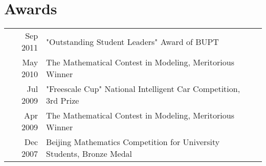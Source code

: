 \documentclass[]{Hsb_resume}
\begin{document}
\begin{minipage}[t]{0.66\textwidth}

\vspace{-4pt}
\section{Awards} 
\begin{tabular}{rll}
Sep 2011   &  "Outstanding Student Leaders" Award of BUPT \\
May 2010  &  The Mathematical Contest in Modeling, Meritorious Winner\\
Jul 2009    &  "Freescale Cup" National Intelligent Car Competition, 3rd Prize\\
Apr 2009   &  The Mathematical Contest in Modeling, Meritorious Winner\\
Dec 2007  &  Beijing Mathematics Competition for University Students, Bronze Medal\\
\end{tabular}
\sectionsep


%
%

\end{minipage} 
\end{document}
